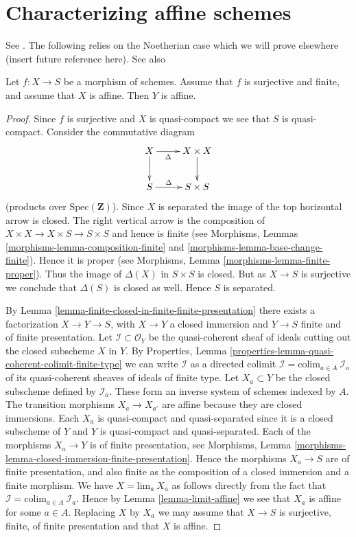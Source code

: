 \section{Characterizing affine schemes}
\label{section-affine}

\noindent
See \cite[A.2]{Conrad-Nagata}. The following relies on the Noetherian
case which we will prove elsewhere (insert future reference here).
See also \cite[II 6.7.1]{EGA}

\begin{lemma}
\label{lemma-affine}
Let $f : X \to S$ be a morphism of schemes.
Assume that $f$ is surjective and finite, and assume that $X$ is affine.
Then $Y$ is affine.
\end{lemma}

\begin{proof}
Since $f$ is surjective and $X$ is quasi-compact we see that $S$ is
quasi-compact. Consider the commutative diagram
$$
\xymatrix{
X \ar[d] \ar[r]_-{\Delta} & X \times X \ar[d] \\
S  \ar[r]^-{\Delta} & S \times S
}
$$
(products over $\text{Spec}(\mathbf{Z})$).
Since $X$ is separated the image of the top horizontal arrow
is closed. The right vertical arrow is the composition of
$X\times X \to X \times S \to S \times S$ and hence is finite
(see Morphisms, Lemmas \ref{morphisms-lemma-composition-finite} and
\ref{morphisms-lemma-base-change-finite}). Hence it is proper (see
Morphisms, Lemma \ref{morphisms-lemma-finite-proper}). Thus the image
of $\Delta(X)$ in $S \times S$ is closed. But as $X \to S$ is surjective
we conclude that $\Delta(S)$ is closed as well. Hence $S$ is separated.

\medskip\noindent
By Lemma \ref{lemma-finite-closed-in-finite-finite-presentation}
there exists a factorization $X \to Y \to S$, with $X \to Y$ a
closed immersion and $Y \to S$ finite and of finite presentation.
Let $\mathcal{I} \subset \mathcal{O}_Y$ be the quasi-coherent sheaf of
ideals cutting out the closed subscheme $X$ in $Y$.
By
Properties, Lemma \ref{properties-lemma-quasi-coherent-colimit-finite-type} 
we can write $\mathcal{I}$ as a directed colimit
$\mathcal{I} = \text{colim}_{a \in A}\ \mathcal{I}_a$ of its
quasi-coherent sheaves of ideals of finite type.
Let $X_a \subset Y$ be the closed subscheme defined by $\mathcal{I}_a$.
These form an inverse system of schemes indexed by $A$.
The transition morphisms $X_a \to X_{a'}$ are affine because
they are closed immersions. Each $X_a$ is quasi-compact and quasi-separated
since it is a closed subscheme of $Y$ and $Y$ is quasi-compact and
quasi-separated.
Each of the morphisms $X_a \to Y$ is of finite presentation, see
Morphisms, Lemma \ref{morphisms-lemma-closed-immersion-finite-presentation}.
Hence the morphisms $X_a \to S$ are of finite presentation, and
also finite as the composition of a closed immersion and a finite morphism.
We have $X = \text{lim}_a\ X_a$ as follows directly from the
fact that $\mathcal{I} = \text{colim}_{a \in A}\ \mathcal{I}_a$.
Hence by Lemma \ref{lemma-limit-affine} we see that $X_a$ is affine for some
$a \in A$. Replacing $X$ by $X_a$ we may assume that $X \to S$ is surjective,
finite, of finite presentation and that $X$ is affine.


\end{proof}
